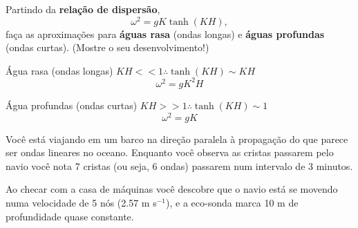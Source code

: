 \documentclass[letterpaper,portuguese,12pt,pdftex]{exam}
\begin{document}
\begin{questions}
\question[4]
Partindo da {\bf relação de dispersão},
\[
  \omega^2 = gK\tanh(KH),
\]
faça as aproximações para {\bf águas rasa} (ondas longas) e {\bf águas profundas}
(ondas curtas). (Mostre o seu desenvolvimento!)

\begin{solution}
\raggedright
      Água rasa (ondas longas) $KH << 1 \therefore \tanh(KH) \sim KH$\\
      \[
        \omega^2 = gK^2H
      \]

      Água profundas (ondas curtas) $KH >> 1 \therefore \tanh(KH) \sim 1$\\
      \[
        \omega^2 = gK
      \]
  \end{solution}

\question
Você está viajando em um barco na direção paralela à propagação do que parece
ser ondas lineares no oceano.  Enquanto você observa as cristas passarem pelo
navio você nota 7 cristas (ou seja, 6 ondas) passarem num intervalo de 3
minutos.

Ao checar com a casa de máquinas você descobre que o navio está se movendo
numa velocidade de 5 nós (2.57 m s$^{-1}$), e a eco-sonda marca 10 m de profundidade
quase constante.

\end{questions}
\end{document}
